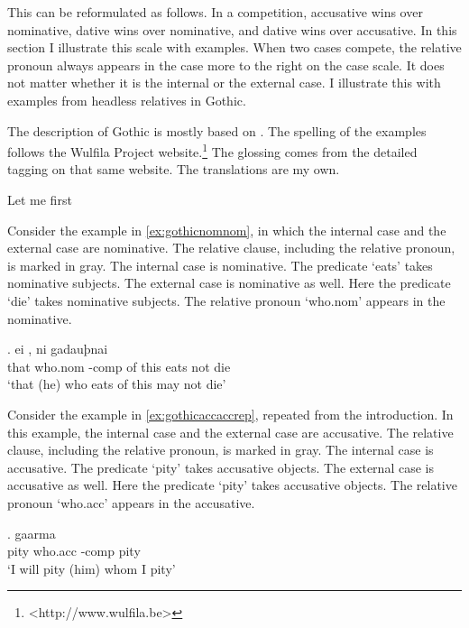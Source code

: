 This can be reformulated as follows. In a competition, accusative wins over nominative, dative wins over nominative, and dative wins over accusative. In this section I illustrate this scale with examples. When two cases compete, the relative pronoun always appears in the case more to the right on the case scale. It does not matter whether it is the internal or the external case. I illustrate this with examples from headless relatives in Gothic.

The description of Gothic is mostly based on \citep{harbert1978}. The spelling of the examples follows the Wulfila Project website.\footnote{
<http://www.wulfila.be>
} The glossing comes from the detailed tagging on that same website. The translations are my own.

Let me first

Consider the example in \ref{ex:gothicnomnom}, in which the internal case and the external case are nominative.
The relative clause, including the relative pronoun, is marked in gray.
The internal case is nominative. The predicate  `eats' takes nominative subjects.
The external case is nominative as well. Here the predicate  `die' takes nominative subjects.
The relative pronoun  `who.\ac{nom}' appears in the nominative.

\exg. ei    , ni gadauþnai\\
that who.\ac{nom} -\ac{comp} {of this} eats\scsub{[nom]} not die\scsub{[nom]}\\
`that (he) who eats of this may not die' \label{ex:gothicnomnom}

Consider the example in \ref{ex:gothicaccaccrep}, repeated from the introduction. In this example, the internal case and the external case are accusative.
The relative clause, including the relative pronoun, is marked in gray.
The internal case is accusative. The predicate  `pity' takes accusative objects.
The external case is accusative as well. Here the predicate  `pity' takes accusative objects.
The relative pronoun  `who.\ac{acc}' appears in the accusative.

\exg. gaarma   \\
 pity\scsub{[acc]} who.\ac{acc} -\ac{comp} pity\scsub{[acc]}\\
 `I will pity (him) whom I pity' \label{ex:gothicaccaccrep}


